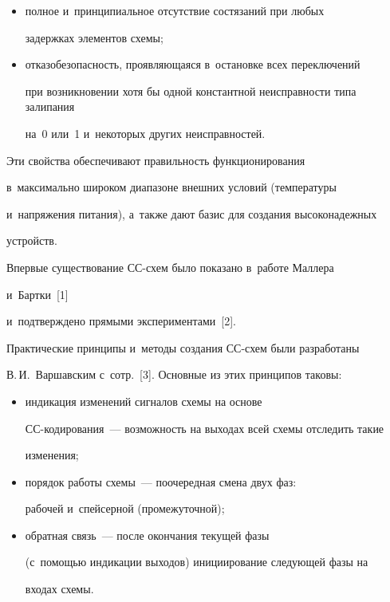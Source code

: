    \begin{itemize}


   \item полное и~принципиальное отсутствие состязаний при любых 


задержках элементов схемы;


   \item отказобезопасность, проявляющаяся в~остановке всех переключений 


при возникновении хотя бы одной константной неисправности типа залипания 


на~0 или~1 и~некоторых других неисправностей.


   \end{itemize}


    


   Эти свойства обеспечивают правильность функционирования 


в~максимально широком диапазоне внешних условий (температуры 


и~напряжения питания), а~также дают базис для создания высоконадежных 


устройств.


   


   Впервые существование СС-схем было показано в~работе Маллера


   и~Бартки~[1] 


и~подтверждено прямыми экспериментами~[2].


   


   Практические принципы и~методы создания СС-схем были разработаны 


В.\,И.~Варшавским с~сотр.~[3]. Основные из этих принципов таковы:


   \begin{itemize}


\item индикация изменений сигналов схемы на основе  


СС-кодирования~--- возможность на выходах всей схемы отследить такие 


изменения;


\item порядок работы схемы~--- поочередная смена двух фаз: 


рабочей и~спейсерной (промежуточной);


\item обратная связь~--- после окончания текущей фазы  


(с~по\-мощью индикации выходов) инициирование следующей фазы на 


входах схемы.


   \end{itemize}


